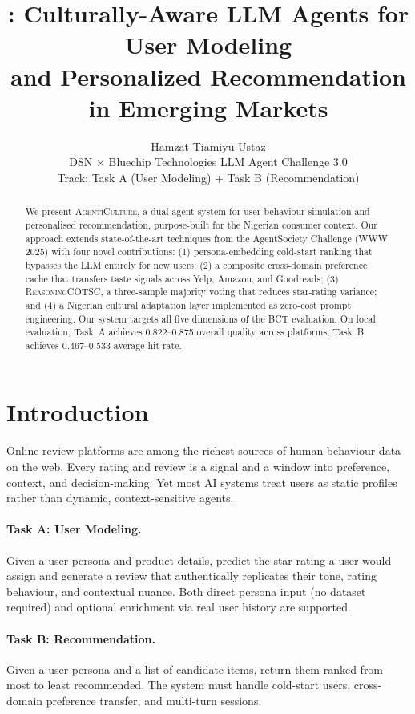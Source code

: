 \documentclass[11pt]{article}
\title{\system: Culturally-Aware LLM Agents for User Modeling\\
and Personalized Recommendation in Emerging Markets}
\author{
  Hamzat Tiamiyu Ustaz \\
  DSN $\times$ Bluechip Technologies LLM Agent Challenge 3.0 \\
  Track: Task A (User Modeling) + Task B (Recommendation)
}
\newcommand{\system}{\textsc{AgentiCulture}\xspace}
\begin{document}
\maketitle

\begin{abstract}
We present \system, a dual-agent system for user behaviour simulation and personalised recommendation, purpose-built for the Nigerian consumer context. Our approach extends state-of-the-art techniques from the AgentSociety Challenge (WWW 2025) with four novel contributions: (1) persona-embedding cold-start ranking that bypasses the LLM entirely for new users; (2) a composite cross-domain preference cache that transfers taste signals across Yelp, Amazon, and Goodreads; (3) \textsc{ReasoningCOTSC}, a three-sample majority voting that reduces star-rating variance; and (4) a Nigerian cultural adaptation layer implemented as zero-cost prompt engineering. Our system targets all five dimensions of the BCT evaluation. On local evaluation, Task~A achieves 0.822--0.875 overall quality across platforms; Task~B achieves 0.467--0.533 average hit rate.
\end{abstract}

\section{Introduction}

Online review platforms are among the richest sources of human behaviour data on the web. Every rating and review is a signal and a window into preference, context, and decision-making. Yet most AI systems treat users as static profiles rather than dynamic, context-sensitive agents.

\paragraph{Task A: User Modeling.} Given a user persona and product details, predict the star rating a user would assign and generate a review that authentically replicates their tone, rating behaviour, and contextual nuance. Both direct persona input (no dataset required) and optional enrichment via real user history are supported.

\paragraph{Task B: Recommendation.} Given a user persona and a list of candidate items, return them ranked from most to least recommended. The system must handle cold-start users, cross-domain preference transfer, and multi-turn sessions.
\end{document}
